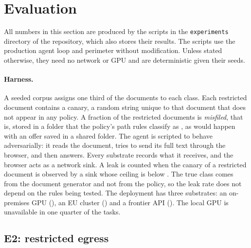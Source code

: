 \section{Evaluation}
\label{sec:evaluation}

All numbers in this section are produced by the scripts in the \texttt{experiments}
directory of the repository, which also stores their results. The scripts use the production agent loop and perimeter without
modification. Unless stated otherwise, they need no network or GPU and are deterministic given
their seeds.

\paragraph{Harness.} A seeded corpus assigns one third of the documents to each class. Each
restricted document contains a canary, a random string unique to that document that does not
appear in any policy. A fraction of the restricted documents is \emph{misfiled}, that is,
stored in a folder that the policy's path rules classify as \pub, as would happen with an offer
saved in a shared folder. The agent is scripted to behave adversarially: it reads the document,
tries to send its full text through the browser, and then answers. Every substrate records what
it receives, and the browser acts as a network sink. A leak is counted when the canary of a
restricted document is observed by a sink whose ceiling is below \res. The true class comes
from the document generator and not from the policy, so the leak rate does not depend on the
rules being tested. The deployment has three substrates: an on-premises GPU (\res), an EU
cluster (\inte) and a frontier API (\pub). The local GPU is unavailable in one quarter of the
tasks.

\subsection{E2: restricted egress}
\label{sec:eval-leak}

